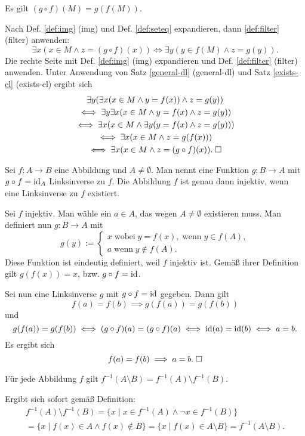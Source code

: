 \begin{Satz}\label{img-chain}
Es gilt $(g\circ f)(M) = g(f(M))$.
\end{Satz}
\begin{Beweis}
Nach Def. \ref{def:img} (img) und Def. \ref{def:seteq} expandieren,
dann \ref{def:filter} (filter) anwenden:%
\[\exists x(x\in M\land z=(g\circ f)(x))
\iff \exists y(y\in f(M)\land z=g(y)).\]
Die rechte Seite mit Def. \ref{def:img} (img) expandieren und
Def. \ref{def:filter} (filter) anwenden. Unter Anwendung von
Satz \ref{general-dl} (general-dl) und Satz \ref{exists-cl} (exists-cl)
ergibt sich
\begin{gather*}
\exists y(\exists x(x\in M\land y=f(x))\land z=g(y))\\
\iff \exists y\exists x(x\in M\land y=f(x)\land z=g(y))\\
\iff \exists x(x\in M\land\exists y(y=f(x)\land z=g(y)))\\
\iff \exists x(x\in M\land z=g(f(x)))\\
\iff \exists x(x\in M\land z=(g\circ f)(x)).\;\square
\end{gather*}
\end{Beweis}

\begin{Satz}\label{left-inverse}
Sei $f\colon A\to B$ eine Abbildung und $A\ne\emptyset$. Man nennt
eine Funktion $g\colon B\to A$ mit $g\circ f=\operatorname{id}_A$ Linksinverse
zu $f$. Die Abbildung $f$ ist genau dann injektiv, wenn eine
Linksinverse zu $f$ existiert.
\end{Satz}
\begin{Beweis}
Sei $f$ injektiv. Man wähle ein $a\in A$, das wegen $A\ne\emptyset$
existieren muss. Man definiert nun $g\colon B\to A$ mit
\[g(y):=\begin{cases}
x\;\text{wobei}\;y=f(x),\;\text{wenn}\;y\in f(A),\\
a\;\text{wenn}\;y\notin f(A).
\end{cases}\]
Diese Funktion ist eindeutig definiert, weil $f$ injektiv ist.
Gemäß ihrer Definition gilt $g(f(x))=x$, bzw. $g\circ f = \operatorname{id}$.

Sei nun eine Linksinverse $g$ mit $g\circ f=\operatorname{id}$ gegeben. Dann gilt
\[f(a)=f(b) \implies g(f(a))=g(f(b))\]
und
\[g(f(a))=g(f(b))
\iff (g\circ f)(a)=(g\circ f)(a)
\iff \operatorname{id}(a)=\operatorname{id}(b)
\iff a=b.\]
Es ergibt sich
\[f(a)=f(b)\implies a=b.\;\square\]
\end{Beweis}

\begin{Satz}\label{preimg-setminus}
Für jede Abbildung $f$ gilt
$f^{-1}(A\setminus B) = f^{-1}(A)\setminus f^{-1}(B)$.
\end{Satz}
\begin{Beweis} Ergibt sich sofort gemäß Definition:
\begin{gather*}
f^{-1}(A)\setminus f^{-1}(B) = \{x\mid x\in f^{-1}(A)\land \neg x\in f^{-1}(B)\}\\
= \{x\mid f(x)\in A\land f(x)\notin B\}
= \{x\mid f(x)\in A\setminus B\}
= f^{-1}(A\setminus B).
\end{gather*}
\end{Beweis}

